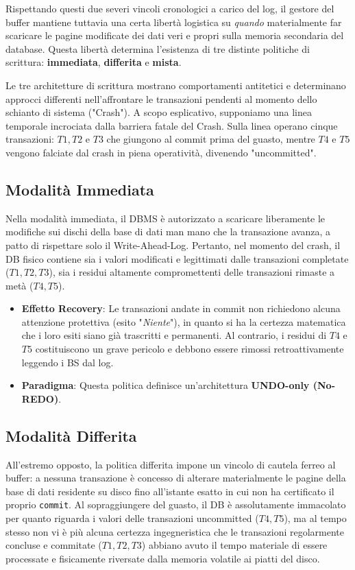 Rispettando questi due severi vincoli cronologici a carico del log, il gestore del buffer mantiene tuttavia una certa libertà logistica su \textit{quando} materialmente far scaricare le pagine modificate dei dati veri e propri sulla memoria secondaria del database. Questa libertà determina l'esistenza di tre distinte politiche di scrittura: \textbf{immediata}, \textbf{differita} e \textbf{mista}.

Le tre architetture di scrittura mostrano comportamenti antitetici e determinano approcci differenti nell'affrontare le transazioni pendenti al momento dello schianto di sistema ("Crash"). A scopo esplicativo, supponiamo una linea temporale incrociata dalla barriera fatale del Crash. Sulla linea operano cinque transazioni: $T1, T2$ e $T3$ che giungono al commit prima del guasto, mentre $T4$ e $T5$ vengono falciate dal crash in piena operatività, divenendo "uncommitted".

\subsection{Modalità Immediata}
Nella modalità immediata, il DBMS è autorizzato a scaricare liberamente le modifiche sui dischi della base di dati man mano che la transazione avanza, a patto di rispettare solo il Write-Ahead-Log. Pertanto, nel momento del crash, il DB fisico contiene sia i valori modificati e legittimati dalle transazioni completate ($T1, T2, T3$), sia i residui altamente compromettenti delle transazioni rimaste a metà ($T4, T5$).

\begin{itemize}
    \item \textbf{Effetto Recovery}: Le transazioni andate in commit non richiedono alcuna attenzione protettiva (esito "\textit{Niente}"), in quanto si ha la certezza matematica che i loro esiti siano già trascritti e permanenti. Al contrario, i residui di $T4$ e $T5$ costituiscono un grave pericolo e debbono essere rimossi retroattivamente leggendo i BS dal log.
    \item \textbf{Paradigma}: Questa politica definisce un'architettura \textbf{UNDO-only (No-REDO)}.
\end{itemize}

\subsection{Modalità Differita}
All'estremo opposto, la politica differita impone un vincolo di cautela ferreo al buffer: a nessuna transazione è concesso di alterare materialmente le pagine della base di dati residente su disco fino all'istante esatto in cui non ha certificato il proprio \texttt{commit}. Al sopraggiungere del guasto, il DB è assolutamente immacolato per quanto riguarda i valori delle transazioni uncommitted ($T4, T5$), ma al tempo stesso non vi è più alcuna certezza ingegneristica che le transazioni regolarmente concluse e commitate ($T1, T2, T3$) abbiano avuto il tempo materiale di essere processate e fisicamente riversate dalla memoria volatile ai piatti del disco.

